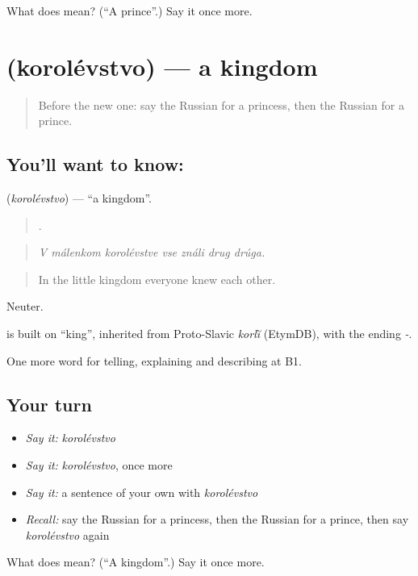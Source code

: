 \begin{tcolorbox}[breakable,colback=teal!4,colframe=teal!35!black,title={Before you move on}]
What does  mean? (\textquotedblleft{}A prince\textquotedblright{}.) Say it once more.
\end{tcolorbox}
\section[\texorpdfstring{\ru{королевство} (korolévstvo)}{королевство (korolévstvo)}]{ (korolévstvo) — a kingdom}

\label{lesson:RU-C321-korolevstvo}



\begin{quote}
Before the new one: say the Russian for a princess, then the Russian for a prince.
\end{quote}

\subsection*{You'll want to know: }
\textbf{} (\emph{korolévstvo}) — \textquotedblleft{}a kingdom\textquotedblright{}.

\begin{quote}
      .
\end{quote}

\begin{quote}
\emph{V málenkom korolévstve vse ználi drug drúga.}
\end{quote}

\begin{quote}
In the little kingdom everyone knew each other.
\end{quote}

Neuter.

\begin{cousinweb}
\emph{} is built on \emph{} \textquotedblleft{}king\textquotedblright{}, inherited from Proto-Slavic \emph{korľĭ} (EtymDB), with the ending \emph{-}.
\end{cousinweb}

\begin{grammarlens}[title={What you've built}]
One more word for telling, explaining and describing at B1.
\end{grammarlens}

\subsection*{Your turn}
\begin{itemize}
\raggedright
  \item \emph{Say it:} \emph{korolévstvo}
  \item \emph{Say it:} \emph{korolévstvo}, once more
  \item \emph{Say it:} a sentence of your own with \emph{korolévstvo}
  \item \emph{Recall:} say the Russian for a princess, then the Russian for a prince, then say \emph{korolévstvo} again
\end{itemize}

\begin{tcolorbox}[breakable,colback=teal!4,colframe=teal!35!black,title={Before you move on}]
What does  mean? (\textquotedblleft{}A kingdom\textquotedblright{}.) Say it once more.
\end{tcolorbox}
